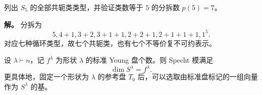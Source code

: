 \begin{workedexample}
列出 $S_5$ 的全部共轭类类型，并验证类数等于 $5$ 的分拆数 $p(5)=7$。

\textbf{解。} 分拆为
\[
5,
4+1,
3+2,
3+1+1,
2+2+1,
2+1+1+1,
1^5.
\]
对应七种循环类型，故七个共轭类，也有七个不等价复不可约表示。
\end{workedexample}


\begin{theorem}
设 $\lambda\vdash n$，记 $f^\lambda$ 为形状 $\lambda$ 的标准 Young 盘个数。则 Specht 模满足
\begin{equation}
\dim S^\lambda=f^\lambda.
\label{eq:specht-dimension-standard-tableaux}
\end{equation}
更具体地，固定一个形状为 $\lambda$ 的参考盘 $T_0$ 后，可以选取由标准盘标记的一组向量作为 $S^\lambda$ 的基。

\end{theorem}

